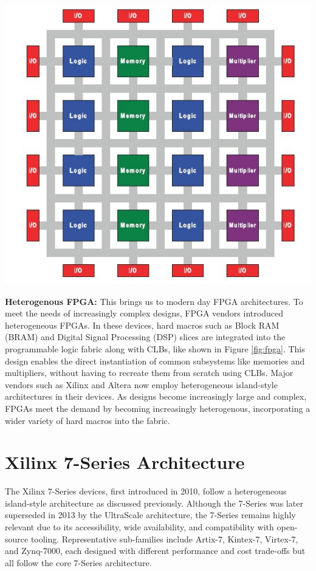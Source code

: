 \documentclass{article}
\begin{document}
\begin{multicols}{2}
    \newpage

    {
        \centering
        \includegraphics[width=\columnwidth]{figures/heterogenous_fpga_3.jpg}
        \label{fig:fpga}
    }

    \textbf{Heterogenous FPGA:} \quad 
    This brings us to modern day FPGA architectures. 
    To meet the needs of increasingly complex designs, FPGA vendors introduced heterogeneous FPGAs. 
    In these devices, hard macros such as Block RAM (BRAM) and Digital Signal Processing (DSP) slices are integrated into the programmable logic fabric along with CLBs, like shown in Figure \ref{fig:fpga}. 
    This design enables the direct instantiation of common subsystems like memories and multipliers, without having to recreate them from scratch using CLBs. 
    Major vendors such as Xilinx and Altera now employ heterogeneous island-style architectures in their devices. 
    As designs become increasingly large and complex, FPGAs meet the demand by becoming increasingly heterogenous, incorporating a wider variety of hard macros into the fabric. 


\section{Xilinx 7-Series Architecture}
    \label{sec:7_series}
    The Xilinx 7-Series devices, first introduced in 2010, follow a heterogeneous island-style architecture as discussed previously. 
    Although the 7-Series was later superseded in 2013 by the UltraScale architecture, the 7-Series remains highly relevant due to its accessibility, wide availability, and compatibility with open-source tooling. 
    Representative sub-families include Artix-7, Kintex-7, Virtex-7, and Zynq-7000, each designed with different performance and cost trade-offs but all follow the core 7-Series architecture.



\end{multicols}
\end{document}
